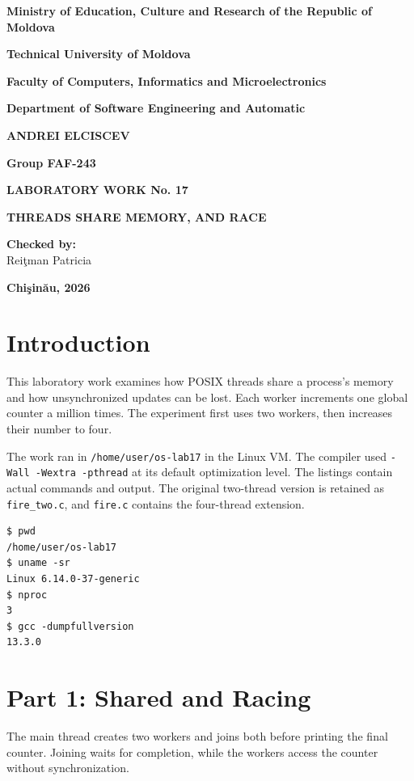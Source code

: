 \documentclass[12pt,a4paper]{article}
\begin{document}
\begin{titlepage}
\centering
\textbf{Ministry of Education, Culture and Research of the Republic of Moldova}\par\medskip
\textbf{Technical University of Moldova}\par\medskip
\textbf{Faculty of Computers, Informatics and Microelectronics}\par\medskip
\textbf{Department of Software Engineering and Automatic}\par
\vspace{2.5cm}
\textbf{ANDREI ELCISCEV}\par
\textbf{Group FAF-243}\par
\vspace{2cm}
{\Large\textbf{LABORATORY WORK No. 17}\par}
\medskip
{\Large\textbf{THREADS SHARE MEMORY, AND RACE}\par}
\vspace{2cm}
\begin{flushright}
\textbf{Checked by:}\\
Rei\c{t}man Patricia
\end{flushright}
\vfill
\textbf{Chi\c{s}in\u{a}u, 2026}
\end{titlepage}
\tableofcontents
\newpage
\section{Introduction}
This laboratory work examines how POSIX threads share a process's memory and how
unsynchronized updates can be lost. Each worker increments one global counter a
million times. The experiment first uses two workers, then increases their number
to four.

The work ran in \texttt{/home/user/os-lab17} in the Linux VM. The compiler used
\texttt{-Wall -Wextra -pthread} at its default optimization level. The listings
contain actual commands and output. The original two-thread version is retained
as \texttt{fire\_two.c}, and \texttt{fire.c} contains the four-thread extension.

\begin{lstlisting}[caption={Working directory, kernel, available CPUs, and compiler}]
$ pwd
/home/user/os-lab17
$ uname -sr
Linux 6.14.0-37-generic
$ nproc
3
$ gcc -dumpfullversion
13.3.0
\end{lstlisting}

\section{Part 1: Shared and Racing}
The main thread creates two workers and joins both before printing the final
counter. Joining waits for completion, while the workers access the counter
without synchronization.
\end{document}
